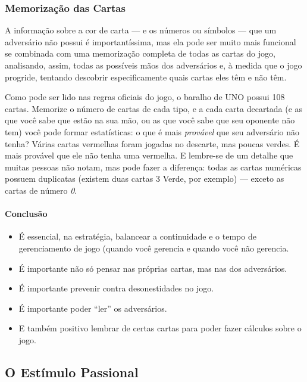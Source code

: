 \subsubsection{Memorização das Cartas}

\label{memorizacaodascartas}

A informação sobre a cor de carta --- e os números ou símbolos --- que um adversário não possui é importantíssima, mas ela pode ser muito mais funcional se combinada com uma memorização completa de todas as cartas do jogo, analisando, assim, todas as possíveis mãos dos adversários e, à medida que o jogo progride, tentando descobrir especificamente quais cartas eles têm e não têm.

Como pode ser lido nas regras oficiais do jogo, o baralho de UNO possui 108 cartas. Memorize o número de cartas de cada tipo, e a cada carta decartada (e as que você sabe que estão na sua mão, ou as que você sabe que seu oponente não tem) você pode formar estatísticas: o que é mais \textit{provável} que seu adversário não tenha? Várias cartas vermelhas foram jogadas no descarte, mas poucas verdes. É mais provável que ele não tenha uma vermelha. E lembre-se de um detalhe que muitas pessoas não notam, mas pode fazer a diferença: todas as cartas numéricas possuem duplicatas (existem duas cartas 3 Verde, por exemplo) --- exceto as cartas de número \textit{0}.

\paragraph{Conclusão}

\begin{itemize}
\item{É essencial, na estratégia, balancear a continuidade e o tempo de gerenciamento de jogo (quando você gerencia e quando você não gerencia.}
\item{É importante não só pensar nas próprias cartas, mas nas dos adversários.}
\item{É importante prevenir contra desonestidades no jogo.}
\item{É importante poder ``ler'' os adversários.}
\item{E também positivo lembrar de certas cartas para poder fazer cálculos sobre o jogo.}
\end{itemize}

\subsection{O Estímulo Passional}

